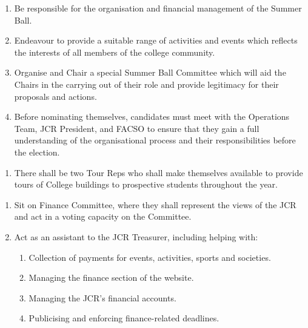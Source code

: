 \begin{enumerate}
    \item Be responsible for the organisation and financial management of the Summer Ball.
    \item Endeavour to provide a suitable range of activities and events which reflects the interests of all members of the college community.
    \item Organise and Chair a special Summer Ball Committee which will aid the Chairs in the carrying out of their role and provide legitimacy for their proposals and actions.
    \item Before nominating themselves, candidates must meet with the Operations Team, JCR President, and FACSO to ensure that they gain a full understanding of the organisational process and their responsibilities before the election.
    
\end{enumerate}

\begin{enumerate}
    \item There shall be two Tour Reps who shall make themselves available to provide tours of College buildings to prospective students throughout the year.
    
\end{enumerate}

\begin{enumerate}
    \item Sit on Finance Committee, where they shall represent the views of the JCR and act in a voting capacity on the Committee.
    \item Act as an assistant to the JCR Treasurer, including helping with:
    \begin{enumerate}
        
        \item Collection of payments for events, activities, sports and societies.
        \item Managing the finance section of the website.
        \item Managing the JCR’s financial accounts.
        \item Publicising and enforcing finance-related deadlines.
    \end{enumerate}
\end{enumerate}

